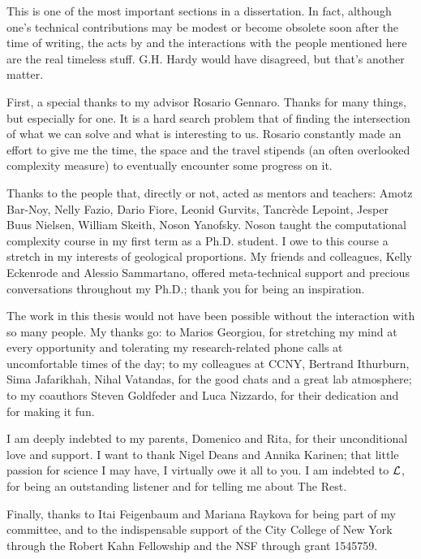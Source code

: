 %
%


This is one of the most important sections in a dissertation. In fact, although one's technical contributions may be modest or become obsolete soon after the time of writing, the acts by and the interactions with the people mentioned here are the real timeless stuff. G.H. Hardy would have disagreed, but that's another matter.

First, a special thanks to my advisor Rosario Gennaro. Thanks for many things, but especially for one. It is a hard search problem that of finding the intersection of what we can solve and what is interesting to us. Rosario constantly made an effort to give me the time,  the space and the travel stipends (an often overlooked complexity measure) to eventually encounter some progress on it. 

Thanks to the people that, directly or not, acted as mentors and teachers: Amotz Bar-Noy, Nelly Fazio, Dario Fiore, Leonid Gurvits, Tancr\`ede Lepoint, Jesper Buus Nielsen, William Skeith, Noson Yanofsky. Noson taught the computational complexity course in my first term as a Ph.D. student. I owe to this course a stretch in my interests of geological proportions. My friends and colleagues, Kelly Eckenrode and Alessio Sammartano, offered meta-technical support and precious conversations throughout my Ph.D.; thank you for being an inspiration.

The work in this thesis would not have been possible without the interaction with so many people. My thanks go: to Marios Georgiou, for stretching my mind at every opportunity and tolerating my research-related phone calls at uncomfortable times of the day;
to my colleagues at CCNY, Bertrand Ithurburn, Sima Jafarikhah, Nihal Vatandas, for the good chats and a great lab atmosphere; 
to my coauthors Steven Goldfeder and Luca Nizzardo, for their dedication and for making it fun. 

I am deeply indebted to my parents, Domenico and Rita, for their unconditional love and support. I want to thank Nigel Deans and Annika Karinen; that little passion for science I may have, I virtually owe it all to you. I am indebted to $\cal{L}$, for being an outstanding listener and for telling me about The Rest. 

Finally, thanks to Itai Feigenbaum and Mariana Raykova for being part of my committee, and to the indispensable support of the City College of New York through the Robert Kahn Fellowship and the NSF through grant 1545759.

\restoregeometry



